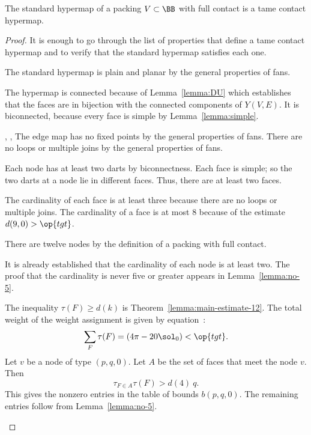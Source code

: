 \begin{theorem} The standard hypermap of a 
  packing $V\subset \BB$ with full contact is a tame contact hypermap.
\end{theorem}
%
%
%
%

\begin{proof} It is enough to go through the list of properties that
  define a tame contact hypermap and to verify that the standard
  hypermap satisfies each one.

\begin{nomerate}
\item {} The standard hypermap is plain and planar by the
  general properties of fans.
\item {} The hypermap is connected because of
  Lemma~\ref{lemma:DU} which establishes that the faces are in
  bijection with the connected components of $Y(V,E)$.  It is
  biconnected, because every face is simple by
  Lemma~\ref{lemma:simple}.  %
\item {}, ,  The
  edge map has no fixed points by the general properties of fans.
  There are no loops or multiple joins by the general properties of
  fans.
\item {} Each node has at least two darts by
  biconnectness. Each face is simple; so the two darts at a node lie
  in different faces.  Thus, there are at least two faces.
\item {} The cardinality of each face is at least three
  because there are no loops or multiple joins.  The cardinality of a
  face is at most $8$ because of the estimate $d(9,0)>\op{tgt}$.
\item {} There are twelve nodes by the definition of a
   packing with full contact.
\item {} It is already established that the cardinality
  of each node is at least two.  The proof that the cardinality is
  never five or greater appears in Lemma~\ref{lemma:no-5}.
\item {} The inequality $\tau(F)\ge d(k)$ is
  Theorem~\ref{lemma:main-estimate-12}.
  The total weight of the weight assignment is given by
  equation~:
\begin{displaymath}
\sum_F \tau(F) = (4\pi - 20\sol_0) < \op{tgt}.
\end{displaymath}
%
Let $v$ be a node of type $(p,q,0)$.  Let $A$ be the set of faces that
meet the node $v$. Then
\begin{displaymath}
\tau_{F\in A}\tau(F) > d(4)~q.
\end{displaymath}
This gives the nonzero entries in the table of bounds $b(p,q,0)$.  The
remaining entries follow from Lemma~\ref{lemma:no-5}.
\end{nomerate}
\end{proof}




